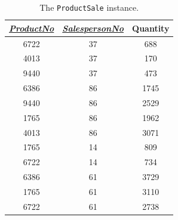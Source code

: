 \documentclass{article}
\begin{document}
\begin{table}[H]
    \centering
    \begin{tabular}{ccc}
        \toprule
        \textbf{\underline{\textit{ProductNo}}} & \textbf{\underline{\textit{SalespersonNo}}} & \textbf{Quantity} \\
        \midrule
        6722                                    & 37                                          & 688               \\
        4013                                    & 37                                          & 170               \\
        9440                                    & 37                                          & 473               \\
        6386                                    & 86                                          & 1745              \\
        9440                                    & 86                                          & 2529              \\
        1765                                    & 86                                          & 1962              \\
        4013                                    & 86                                          & 3071              \\
        1765                                    & 14                                          & 809               \\
        6722                                    & 14                                          & 734               \\
        6386                                    & 61                                          & 3729              \\
        1765                                    & 61                                          & 3110              \\
        6722                                    & 61                                          & 2738              \\
        \bottomrule
    \end{tabular}
    \caption{The \texttt{ProductSale} instance.}
    \label{tab:productsale}
\end{table}
\end{document}
